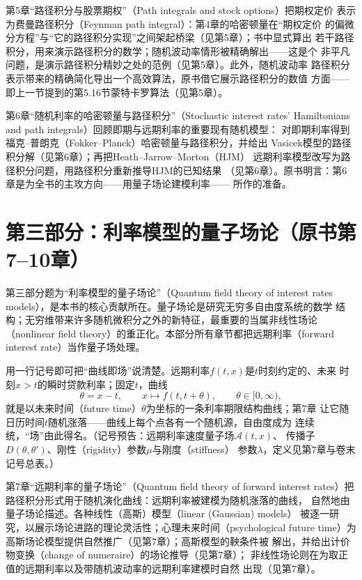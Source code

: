 第5章“路径积分与股票期权”（Path integrals and stock options）把期权定价
表示为费曼路径积分（Feynman path integral）：第4章的哈密顿量在“期权定价
的偏微分方程”与“它的路径积分实现”之间架起桥梁（见第5章）；书中显式算出
若干路径积分，用来演示路径积分的数学；随机波动率情形被精确解出——这是个
非平凡问题，是演示路径积分精妙之处的范例（见第5章）。此外，随机波动率
路径积分表示带来的精确简化导出一个高效算法，原书借它展示路径积分的数值
方面——即上一节提到的第5.16节蒙特卡罗算法（见第5章）。

第6章“随机利率的哈密顿量与路径积分”（Stochastic interest rates'
Hamiltonians and path integrals）回顾即期与远期利率的重要现有随机模型：
对即期利率得到福克--普朗克（Fokker--Planck）哈密顿量与路径积分，并给出
Vasicek模型的路径积分解（见第6章）；再把Heath--Jarrow--Morton（HJM）
远期利率模型改写为路径积分问题，用路径积分重新推导HJM的已知结果
（见第6章）。原书明言：第6章是为全书的主攻方向——用量子场论建模利率——
所作的准备。

\section{第三部分：利率模型的量子场论（原书第7--10章）}

第三部分题为“利率模型的量子场论”（Quantum field theory of interest rates
models），是本书的核心贡献所在。量子场论是研究无穷多自由度系统的数学
结构；无穷维带来许多随机微积分之外的新特征，最重要的当属非线性场论
（nonlinear field theory）的重正化。本部分所有章节都把远期利率（forward
interest rate）当作量子场处理。

用一行记号即可把“曲线即场”说清楚。远期利率$f(t,x)$是$t$时刻约定的、未来
时刻$x>t$的瞬时贷款利率；固定$t$，曲线
\begin{equation*}
\theta=x-t,\qquad x\mapsto f(t,t+\theta),\qquad \theta\in[0,\infty),
\end{equation*}
就是以未来时间（future time）$\theta$为坐标的一条利率期限结构曲线；第7章
让它随日历时间$t$随机涨落——曲线上每个点各有一个随机源，自由度成为
连续统，“场”由此得名。（记号预告：远期利率速度量子场$\mathcal{A}(t,x)$、
传播子$D(\theta,\theta')$、刚性（rigidity）参数$\mu$与刚度（stiffness）
参数$\lambda$，定义见第7章与卷末记号总表。）

第7章“远期利率的量子场论”（Quantum field theory of forward interest
rates）把路径积分形式用于随机演化曲线：远期利率被建模为随机涨落的曲线，
自然地由量子场论描述。各种线性（高斯）模型（linear (Gaussian) models）
被逐一研究，以展示场论进路的理论灵活性；心理未来时间（psychological
future time）为高斯场论模型提供自然推广（见第7章）；高斯模型的鞅条件被
解出，并给出计价物变换（change of numeraire）的场论推导（见第7章）；
非线性场论则在为取正值的远期利率以及带随机波动率的远期利率建模时自然
出现（见第7章）。

